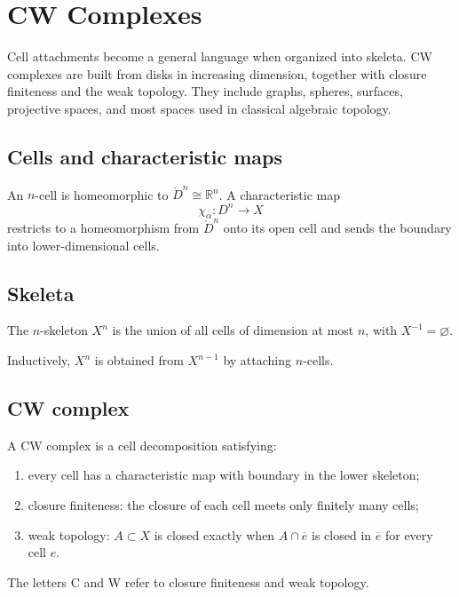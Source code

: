 ﻿\chapter{CW Complexes}
\label{ch:viii06-cw-complexes}

Cell attachments become a general language when organized into skeleta.  CW
complexes are built from disks in increasing dimension, together with closure
finiteness and the weak topology.  They include graphs, spheres, surfaces,
projective spaces, and most spaces used in classical algebraic topology.

\section{Cells and characteristic maps}
An \(n\)-cell is homeomorphic to \(\mathring D^n\cong\mathbb R^n\).  A
characteristic map
\[
\chi_\alpha:D^n\to X
\]
restricts to a homeomorphism from \(\mathring D^n\) onto its open cell and sends
the boundary into lower-dimensional cells.

\section{Skeleta}
\begin{definition}[Skeleton]\label{def:viii06-skeleton}
The \(n\)-skeleton \(X^n\) is the union of all cells of dimension at most \(n\),
with \(X^{-1}=\varnothing\).
\end{definition}
Inductively, \(X^n\) is obtained from \(X^{n-1}\) by attaching \(n\)-cells.

\section{CW complex}
\begin{definition}[CW complex]\label{def:viii06-cw}
A CW complex is a cell decomposition satisfying:
\begin{enumerate}
\item every cell has a characteristic map with boundary in the lower skeleton;
\item closure finiteness: the closure of each cell meets only finitely many cells;
\item weak topology: \(A\subset X\) is closed exactly when
\(A\cap\overline e\) is closed in \(\overline e\) for every cell \(e\).
\end{enumerate}
\end{definition}
The letters C and W refer to closure finiteness and weak topology.

